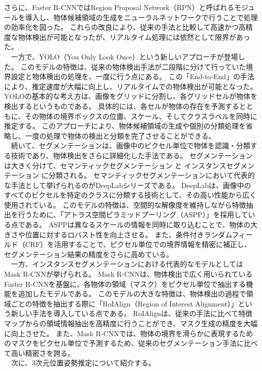 さらに、Faster R-CNNではRegion Proposal Network（RPN）と呼ばれるモジュールを導入し、物体候補領域の生成をニューラルネットワークで行うことで処理の効率化を図った。
これらの改良により、従来の手法と比較して高速かつ高精度な物体検出が可能となったが、リアルタイム処理には依然として限界があった。\\
　一方で、YOLO（You Only Look Once）という新しいアプローチが登場した。
このモデルの特徴は、従来の物体検出手法が二段階に分けて行っていた境界設定と物体検出の処理を、一度に行う点にある。
この「End-to-End」の手法により、推定速度が大幅に向上し、リアルタイムでの物体検出が可能となった。
YOLOの基本的な考え方は、画像をグリッドに分割し、各グリッドセルが物体を検出するというものである。
具体的には、各セルが物体の存在を予測するとともに、その物体の境界ボックスの位置、スケール、そしてクラスラベルを同時に推定する。
このアプローチにより、物体候補領域の生成や個別の分類処理を省略し、一度の処理で物体の検出と分類を完了させることができる。\\
　続いて、セグメンテーションは、画像中のピクセル単位で物体を認識・分類する技術であり、物体検出をさらに詳細化した手法である。
セグメンテーションは大きく分けて、セマンティックセグメンテーション と インスタンスセグメンテーション に分類される。
セマンティックセグメンテーションにおいて代表的な手法として挙げられるのがDeepLabシリーズである。
DeepLabは、画像中のすべてのピクセルを特定のクラスに分類する技術として、その高い性能から広く使用されている。
このモデルの特徴は、空間的な解像度を維持しながら特徴抽出を行うために、「アトラス空間ピラミッドプーリング（ASPP）」を採用している点である。
ASPPは異なるスケールの情報を同時に取り込むことで、物体の大きさや位置に対するロバスト性を向上させる。
また、条件付きランダムフィールド（CRF）を活用することで、ピクセル単位での境界情報を精密に補正し、セグメンテーション結果の精度をさらに高めている。\\
　一方、インスタンスセグメンテーションにおける代表的なモデルとしてはMask R-CNNが挙げられる。
Mask R-CNNは、物体検出で広く用いられているFaster R-CNNを基盤に、各物体の領域（マスク）をピクセル単位で抽出する機能を追加したモデルである。
このモデルの大きな特徴は、物体検出の過程で領域ごとの特徴を抽出する際に「RoIAlign（Region of Interest Alignment）」という新しい手法を導入している点である。
RoIAlignは、従来の手法に比べて特徴マップからの領域情報抽出を高精度に行うことができ、マスク生成の精度を大幅に向上させた。
また、Mask R-CNNでは、物体の境界を滑らかに表現するためのマスクをピクセル単位で予測するため、従来のセグメンテーション手法に比べて高い精密さを誇る。\\
　次に、3次元位置姿勢推定について紹介する。
